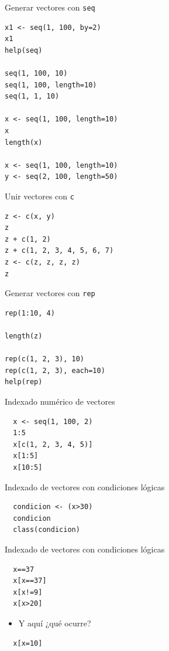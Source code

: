 \documentclass[xcolor={usenames,svgnames,dvipsnames}]{beamer}
\begin{document}
\begin{frame}[fragile,label=sec-2-1-5]{Generar vectores con \texttt{seq}}
 \lstset{language=R,label= ,caption= ,numbers=none}
\begin{lstlisting}
x1 <- seq(1, 100, by=2)
x1
help(seq)

seq(1, 100, 10)
seq(1, 100, length=10)
seq(1, 1, 10)

x <- seq(1, 100, length=10)
x
length(x)

x <- seq(1, 100, length=10)
y <- seq(2, 100, length=50)
\end{lstlisting}
\end{frame}

\begin{frame}[fragile,label=sec-2-1-6]{Unir vectores con \texttt{c}}
 \lstset{language=R,label= ,caption= ,numbers=none}
\begin{lstlisting}
z <- c(x, y)
z
z + c(1, 2)
z + c(1, 2, 3, 4, 5, 6, 7)
z <- c(z, z, z, z)
z
\end{lstlisting}
\end{frame}

\begin{frame}[fragile,label=sec-2-1-7]{Generar vectores con \texttt{rep}}
 \lstset{language=R,label= ,caption= ,numbers=none}
\begin{lstlisting}
rep(1:10, 4)

length(z)

rep(c(1, 2, 3), 10)
rep(c(1, 2, 3), each=10)
help(rep)
\end{lstlisting}
\end{frame}


\begin{frame}[fragile,label=sec-2-1-8]{Indexado numérico de vectores}
 \lstset{language=R,label= ,caption= ,numbers=none}
\begin{lstlisting}
  x <- seq(1, 100, 2)
  1:5
  x[c(1, 2, 3, 4, 5)]
  x[1:5]
  x[10:5]
\end{lstlisting}
\end{frame}

\begin{frame}[fragile,label=sec-2-1-9]{Indexado de vectores con condiciones lógicas}
 \lstset{language=R,label= ,caption= ,numbers=none}
\begin{lstlisting}
  condicion <- (x>30)
  condicion
  class(condicion)
\end{lstlisting}
\end{frame}

\begin{frame}[fragile,label=sec-2-1-10]{Indexado de vectores con condiciones lógicas}
 \lstset{language=R,label= ,caption= ,numbers=none}
\begin{lstlisting}
  x==37
  x[x==37]
  x[x!=9]
  x[x>20]
\end{lstlisting}

\begin{itemize}
\item Y aquí ¿qué ocurre?
\end{itemize}
\lstset{language=R,label= ,caption= ,numbers=none}
\begin{lstlisting}
  x[x=10]
\end{lstlisting}
\end{frame}
\end{document}
